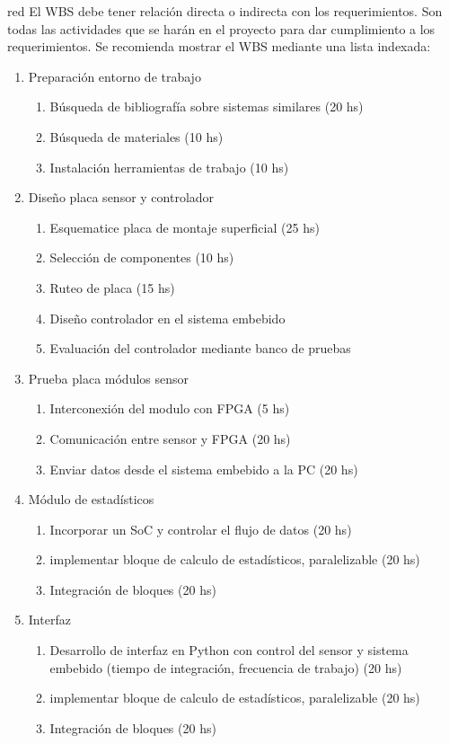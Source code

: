 \documentclass[
11pt, %
codirector, %
]{charter}
\begin{document}
\begin{consigna}{red}
El WBS debe tener relación directa o indirecta con los requerimientos.  Son todas las actividades que se harán en el proyecto para dar cumplimiento a los requerimientos. Se recomienda mostrar el WBS mediante una lista indexada:

\begin{enumerate}
\item Preparación entorno de trabajo
	\begin{enumerate}
	\item Búsqueda de bibliografía sobre sistemas similares (20 hs)
	\item Búsqueda de materiales (10 hs)
	\item Instalación herramientas de trabajo (10 hs)
	\end{enumerate}
\item Diseño placa sensor y controlador
	\begin{enumerate}
	\item Esquematice placa de montaje superficial (25 hs)
	\item Selección de componentes (10 hs)
	\item Ruteo de placa (15 hs)
	\item Diseño controlador en el sistema embebido
	\item Evaluación del controlador mediante banco de pruebas
	\end{enumerate}
\item Prueba placa módulos sensor
	\begin{enumerate}
	\item Interconexión del modulo con FPGA (5 hs)
	\item Comunicación entre sensor y FPGA (20 hs)
	\item Enviar datos desde el sistema embebido a la PC (20 hs)
	\end{enumerate}

\item Módulo de estadísticos
	\begin{enumerate}
	\item Incorporar un SoC y controlar el flujo de datos (20 hs)
	\item implementar bloque de calculo de estadísticos, paralelizable (20 hs)
	\item Integración de bloques (20 hs)
	\end{enumerate}	

\item Interfaz
	\begin{enumerate}
	\item Desarrollo de interfaz en Python con control del sensor y sistema embebido (tiempo de integración, frecuencia de trabajo) (20 hs)
	\item implementar bloque de calculo de estadísticos, paralelizable (20 hs)
	\item Integración de bloques (20 hs)
	\end{enumerate}		


\end{enumerate}
\end{consigna}
\end{document}
